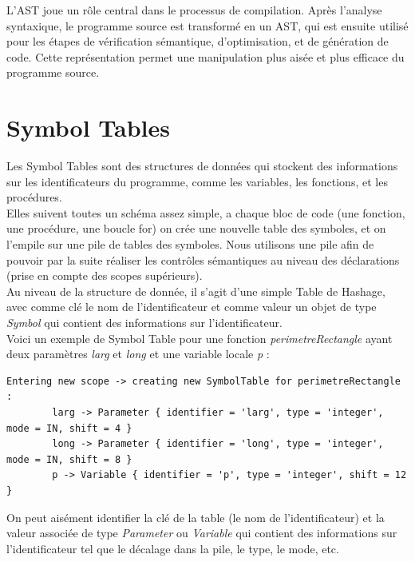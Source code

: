 \documentclass[french,a4paper]{article}
\begin{document}
    L'AST joue un rôle central dans le processus de compilation.
    Après l'analyse syntaxique, le programme source est transformé en un AST, qui est ensuite utilisé pour les étapes de vérification sémantique, d'optimisation, et de génération de code.
    Cette représentation permet une manipulation plus aisée et plus efficace du programme source.

    \section{Symbol Tables}

    Les Symbol Tables sont des structures de données qui stockent des informations sur les identificateurs du programme, comme les variables, les fonctions, et les procédures. \\

    Elles suivent toutes un schéma assez simple, a chaque bloc de code (une fonction, une procédure, une boucle for) on crée une nouvelle table des symboles, et on l'empile sur une pile de tables des symboles. Nous utilisons une pile afin de pouvoir par la suite réaliser les contrôles sémantiques au niveau des déclarations (prise en compte des scopes supérieurs).  \\


    Au niveau de la structure de donnée, il s'agit d'une simple Table de Hashage, avec comme clé le nom de l'identificateur et comme valeur un objet de type \textit{Symbol} qui contient des informations sur l'identificateur. \\

    Voici un exemple de Symbol Table pour une fonction \textit{perimetreRectangle} ayant deux paramètres \textit{larg} et \textit{long} et une variable locale \textit{p} :
    \begin{lstlisting}[label={lst:lstlisting16}]
    Entering new scope -> creating new SymbolTable for perimetreRectangle  : 
        larg -> Parameter { identifier = 'larg', type = 'integer', mode = IN, shift = 4 }
        long -> Parameter { identifier = 'long', type = 'integer', mode = IN, shift = 8 }
        p -> Variable { identifier = 'p', type = 'integer', shift = 12 }
    \end{lstlisting}

    On peut aisément identifier la clé de la table (le nom de l'identificateur) et la valeur associée de type \textit{Parameter} ou \textit{Variable} qui contient des informations sur l'identificateur tel que le décalage dans la pile, le type, le mode, etc. \\
\end{document}
